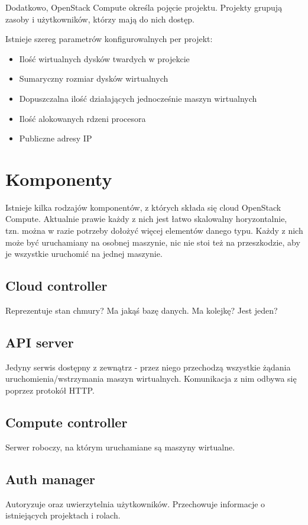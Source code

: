 \documentclass[a4paper,10pt]{article}
\begin{document}
Dodatkowo, OpenStack Compute określa pojęcie projektu. Projekty grupują zasoby i użytkowników, którzy mają do nich dostęp.

Istnieje szereg parametrów konfigurowalnych per projekt\cite{nova_doc}:

\begin{itemize}
\item Ilość wirtualnych dysków twardych w projekcie
\item Sumaryczny rozmiar dysków wirtualnych
\item Dopuszczalna ilość działających jednocześnie maszyn wirtualnych
\item Ilość alokowanych rdzeni procesora
\item Publiczne adresy IP
\end{itemize}

\section{Komponenty}

Istnieje kilka rodzajów komponentów, z których składa się cloud OpenStack Compute\cite{nova_doc}.
Aktualnie prawie każdy z nich jest łatwo skalowalny horyzontalnie, tzn. można w razie potrzeby dołożyć więcej elementów danego typu. Każdy z nich może być uruchamiany na osobnej maszynie, nic nie stoi też na przeszkodzie, aby je wszystkie uruchomić na jednej maszynie.

\subsection{Cloud controller}
Reprezentuje stan chmury? Ma jakąś bazę danych. Ma kolejkę? Jest jeden? %

\subsection{API server}
Jedyny serwis dostępny z zewnątrz - przez niego przechodzą wszystkie żądania uruchomienia/wstrzymania maszyn wirtualnych. Komunikacja z nim odbywa się poprzez protokół HTTP. 

\subsection{Compute controller}
Serwer roboczy, na którym uruchamiane są maszyny wirtualne.

\subsection{Auth manager}
Autoryzuje oraz uwierzytelnia użytkowników. Przechowuje informacje o istniejących projektach i rolach.
\end{document}
